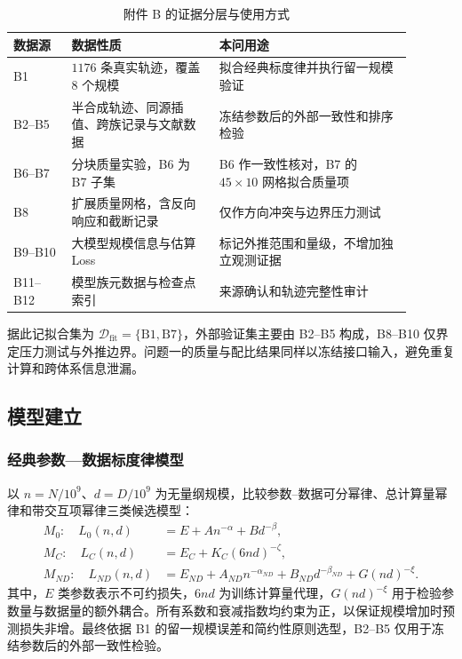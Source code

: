 \begin{table}[!htbp]
\centering
\small
\setlength{\tabcolsep}{4pt}
\caption{附件 B 的证据分层与使用方式}
\label{tab:p2_evidence}
\begin{tabular}{p{0.13\linewidth}p{0.33\linewidth}p{0.43\linewidth}}
\toprule
数据源 & 数据性质 & 本问用途 \\
\midrule
B1 & $1176$ 条真实轨迹，覆盖 $8$ 个规模 & 拟合经典标度律并执行留一规模验证 \\
B2--B5 & 半合成轨迹、同源插值、跨族记录与文献数据 & 冻结参数后的外部一致性和排序检验 \\
B6--B7 & 分块质量实验，B6 为 B7 子集 & B6 作一致性核对，B7 的 $45\times10$ 网格拟合质量项 \\
B8 & 扩展质量网格，含反向响应和截断记录 & 仅作方向冲突与边界压力测试 \\
B9--B10 & 大模型规模信息与估算 Loss & 标记外推范围和量级，不增加独立观测证据 \\
B11--B12 & 模型族元数据与检查点索引 & 来源确认和轨迹完整性审计 \\
\bottomrule
\end{tabular}
\end{table}

据此记拟合集为 $\mathcal D_{\mathrm{fit}}=\{\mathrm{B1},\mathrm{B7}\}$，外部验证集主要由 B2--B5 构成，B8--B10 仅界定压力测试与外推边界。问题一的质量与配比结果同样以冻结接口输入，避免重复计算和跨体系信息泄漏。

\subsection{模型建立}

\subsubsection{经典参数—数据标度律模型}

以 $n=N/10^9$、$d=D/10^9$ 为无量纲规模，比较参数--数据可分幂律、总计算量幂律和带交互项幂律三类候选模型：
\begin{align}
M_0:\quad L_0(n,d)
&=E+A n^{-\alpha}+B d^{-\beta},
\label{eq:p2_classic_m0}\\
M_C:\quad L_C(n,d)
&=E_C+K_C(6nd)^{-\zeta},
\label{eq:p2_classic_mc}\\
M_{ND}:\quad L_{ND}(n,d)
&=E_{ND}+A_{ND}n^{-\alpha_{ND}}
+B_{ND}d^{-\beta_{ND}}+G(nd)^{-\xi}.
\label{eq:p2_classic_mnd}
\end{align}
其中，$E$ 类参数表示不可约损失，$6nd$ 为训练计算量代理，$G(nd)^{-\xi}$ 用于检验参数量与数据量的额外耦合。所有系数和衰减指数均约束为正，以保证规模增加时预测损失非增。最终依据 B1 的留一规模误差和简约性原则选型，B2--B5 仅用于冻结参数后的外部一致性检验。

